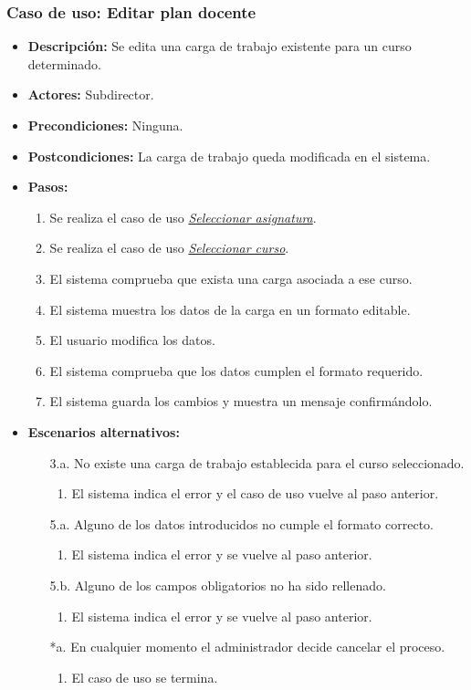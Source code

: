\subsubsection*{Caso de uso: Editar plan docente}
\begin{itemize}
\item{\bf Descripción:} Se edita una carga de trabajo existente para un curso determinado.
\item{\bf Actores:} Subdirector.
\item{\bf Precondiciones:} Ninguna.
\item{\bf Postcondiciones:} La carga de trabajo queda modificada en el sistema.
\item{\bf Pasos:}
	\begin{enumerate}
	\item Se realiza el caso de uso {\em \hyperref[select_asignatura]{Seleccionar asignatura}}.
	\item Se realiza el caso de uso {\em \hyperref[select_curso]{Seleccionar curso}}.
	\item El sistema comprueba que exista una carga asociada a ese curso.
	\item El sistema muestra los datos de la carga en un formato editable.
	\item El usuario modifica los datos.
	\item El sistema comprueba que los datos cumplen el formato requerido.
	\item El sistema guarda los cambios y muestra un mensaje confirmándolo.
	\end{enumerate}
\item{\bf Escenarios alternativos:}
	\begin{itemize}
	\item[3.a.] No existe una carga de trabajo establecida para el curso seleccionado.
		\begin{enumerate}
		\item El sistema indica el error y el caso de uso vuelve al paso anterior.
		\end{enumerate}
	\item[5.a.] Alguno de los datos introducidos no cumple el formato correcto.
		\begin{enumerate}
		\item El sistema indica el error y se vuelve al paso anterior.
		\end{enumerate}
	\item[5.b.] Alguno de los campos obligatorios no ha sido rellenado.
		\begin{enumerate}
		\item El sistema indica el error y se vuelve al paso anterior.
		\end{enumerate}	
	\item[*a.] En cualquier momento el administrador decide cancelar el proceso.
		\begin{enumerate}
		\item El caso de uso se termina.
		\end{enumerate}
	\end{itemize}
\end{itemize}



